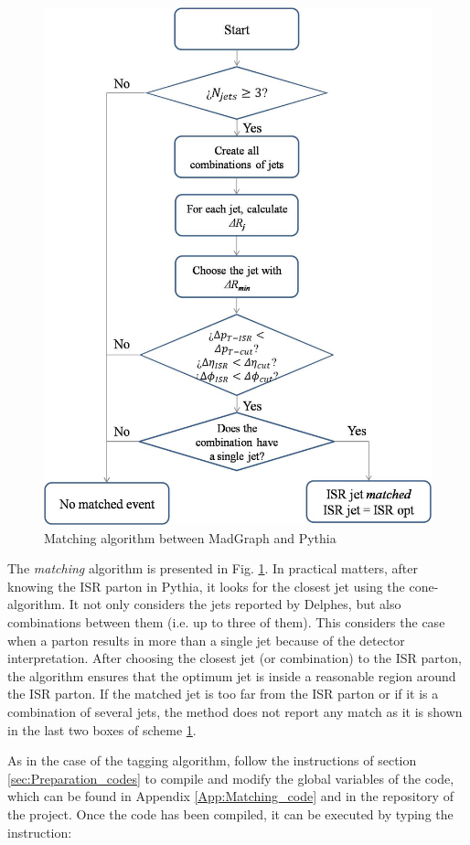 \documentclass[12pt, oneside]{book}              %
\begin{document}
\begin{figure} [h!]
\centering
\includegraphics[width=0.7\linewidth]{./Imags_Doc/Matching_algorithm}
\caption[Matching algorithm]{Matching algorithm between MadGraph and Pythia}
\label{fig:Matching_algorithm}
\end{figure}

The \textit{matching} algorithm is presented in Fig. \ref{fig:Matching_algorithm}.
In practical matters, after knowing the ISR parton in Pythia, it looks for the
closest jet using the cone-algorithm. It not only considers the jets reported
by Delphes, but also combinations between them (i.e. up to three of them). This
considers the case when a parton results in more than a single jet because of 
the detector interpretation. After choosing the closest jet (or combination) to
the ISR parton, the algorithm ensures that the optimum jet is inside a reasonable
region around the ISR parton. If the matched jet is too far from the ISR parton
or if it is a combination of several jets, the method does not report any 
match as it is shown in the last two boxes of scheme \ref{fig:Matching_algorithm}.

As in the case of the tagging algorithm, follow the instructions of section
\ref{sec:Preparation_codes} to compile and modify the global variables of
the code, which can be found in Appendix \ref{App:Matching_code} and in the
repository of the project. Once the code has been compiled, it can be executed
by typing the instruction:
\end{document}
